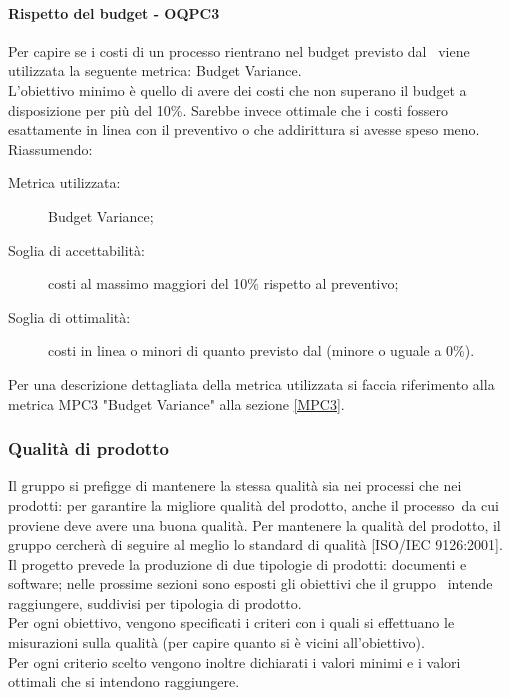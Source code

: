 \documentclass[../PianoDiQualifica.tex]{subfiles}
\begin{document}
		\paragraph{Rispetto del budget - OQPC3}
		Per capire se i costi di un processo rientrano nel budget previsto dal \pianodiprogetto\ viene utilizzata la seguente metrica: Budget Variance.\\
		L’obiettivo minimo è quello di avere dei costi che non superano il budget a disposizione per più del 10\%. Sarebbe invece ottimale che i costi fossero esattamente in linea con il preventivo o che addirittura si avesse speso meno.\\
		Riassumendo:
		\begin{description}
			\item[Metrica utilizzata:] Budget Variance;
			\item[Soglia di accettabilità:] costi al massimo maggiori del 10\% rispetto al preventivo;
			\item[Soglia di ottimalità:] costi in linea o minori di quanto previsto dal \pianodiprogetto (minore o uguale a 0\%).
		\end{description}
		Per una descrizione dettagliata della metrica utilizzata si faccia riferimento alla metrica MPC3 "Budget Variance" alla sezione \ref{MPC3}.
		
		\subsubsection{Qualità di prodotto}
		Il gruppo si prefigge di mantenere la stessa qualità sia nei processi che nei prodotti: per garantire la migliore qualità del prodotto\g, anche il processo\g\ da cui proviene deve avere una buona qualità. Per mantenere la qualità del prodotto\g, il gruppo cercherà di seguire al meglio lo standard di qualità [ISO/IEC 9126:2001].\\
		Il progetto prevede la produzione di due tipologie di prodotti: documenti e software\g; nelle prossime sezioni sono esposti gli obiettivi che il gruppo \leaf\ intende raggiungere, suddivisi per tipologia di prodotto\g.\\
		Per ogni obiettivo, vengono specificati i criteri con i quali si effettuano le misurazioni sulla qualità (per capire quanto si è vicini all’obiettivo).\\
		Per ogni criterio scelto vengono inoltre dichiarati i valori minimi e i valori ottimali che si intendono raggiungere.
				
\end{document}
